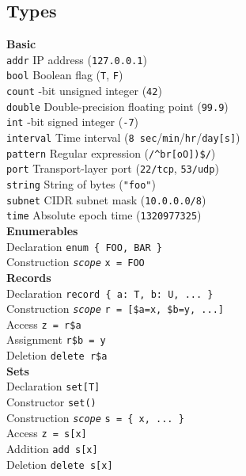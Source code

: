 \documentclass[10pt,landscape]{article}
\newcommand{\minisec}[1]{\textbf{#1}\\}
\begin{document}
\begin{multicols*}{3}
\subsection*{Types}

\minisec{Basic}
\verb|addr| \dotfill IP address (\verb|127.0.0.1|)\\
\verb|bool| \dotfill Boolean flag (\verb|T|, \verb|F|)\\
\verb|count| -bit unsigned integer (\verb|42|)\\
\verb|double| \dotfill Double-precision floating point (\verb|99.9|)\\
\verb|int| -bit signed integer (\verb|-7|)\\
\verb|interval| \dotfill Time interval
  (\verb|8 sec|/\verb|min|/\verb|hr|/\verb|day[s]|)\\
\verb|pattern| \dotfill Regular expression (\verb|/^br[oO])$/|)\\
\verb|port| \dotfill Transport-layer port
  (\verb|22/tcp|, \verb|53/udp|)\\
\verb|string| \dotfill String of bytes (\verb|"foo"|)\\
\verb|subnet| \dotfill CIDR subnet mask (\verb|10.0.0.0/8|)\\
\verb|time| \dotfill Absolute epoch time (\verb|1320977325|)\\

\minisec{Enumerables}
Declaration \dotfill \verb|enum { FOO, BAR }|\\
Construction \dotfill \texttt{\textit{scope}} \verb|x = FOO|\\

\minisec{Records}
Declaration \dotfill \verb|record { a: T, b: U, ... }|\\
Construction \dotfill \texttt{\textit{scope}} \verb|r = [$a=x, $b=y, ...]|\\
Access \dotfill \verb|z = r$a|\\
Assignment \dotfill \verb|r$b = y|\\
Deletion \dotfill \verb|delete r$a|\\

\minisec{Sets}
Declaration \dotfill \verb|set[T]|\\
Constructor \dotfill \verb|set()|\\
Construction \dotfill \texttt{\textit{scope}} \verb|s = { x, ... }|\\
Access \dotfill \verb|z = s[x]|\\
Addition \dotfill \verb|add s[x]|\\
Deletion \dotfill \verb|delete s[x]|\\


\end{multicols*}
\end{document}
